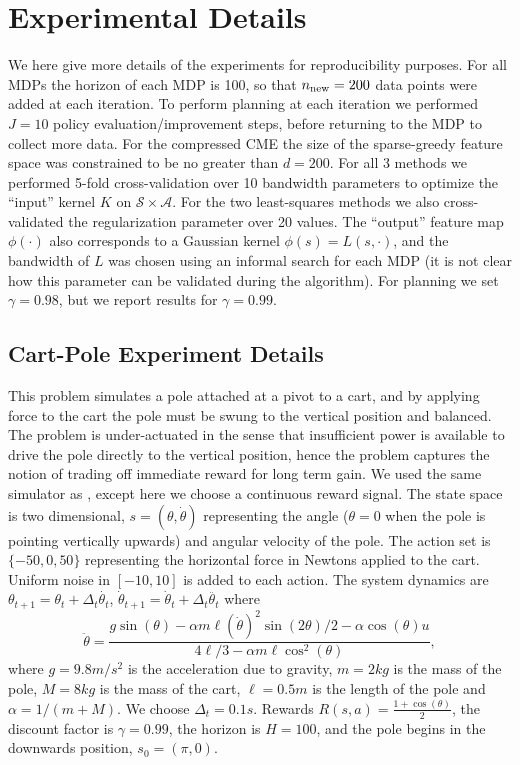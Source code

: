 \documentclass[letterpaper]{article}
\newcommand{\todoc}[2][]{\todo[color=red!20!white,size=\tiny,#1]{#2}}
\newcommand{\cA}{{\mathcal A}}
\newcommand{\cS}{{\mathcal S}}
\begin{document}
\section{Experimental Details} \label{ExperimentDetails}

We here give more details of the experiments for reproducibility purposes. For all MDPs the horizon of each MDP is 100, so that $n_{\rm new} = 200$ data points were added at each iteration. To perform planning at each iteration we performed $J=10$ policy evaluation/improvement steps, before returning to the MDP to collect more data. For the compressed CME the size of the sparse-greedy feature space was constrained to be no greater than $d=200$. For all 3 methods we performed 5-fold cross-validation over 10 bandwidth parameters to optimize the ``input'' kernel $K$ on $\cS\times\cA$. For the two least-squares methods we also cross-validated the regularization parameter over 20 values. The ``output'' feature map $\phi(\cdot)$ also corresponds to a Gaussian kernel $\phi(s) = L(s,\cdot)$, and the bandwidth of $L$ was chosen using an informal search for each MDP (it is not clear how this parameter can be validated during the algorithm). For planning we set $\gamma=0.98$, but we report results for $\gamma=0.99$. \todoc{Why? This is weird and calls for an explanation.}

\subsection{Cart-Pole Experiment Details}

This problem simulates a pole attached at a pivot to a cart, and by applying force to the cart the pole must be swung to the vertical position and balanced. The problem is under-actuated in the sense that insufficient power is available to drive the pole directly to the vertical position, hence the problem captures the notion of trading off immediate reward for long term gain. We used the same simulator as \citet{DBLP:journals/jmlr/LagoudakisP03}, except here we choose a continuous reward signal. The state space is two dimensional, $s = (\theta, \dot{\theta})$ representing the angle ($\theta = 0$ when the pole is pointing vertically upwards) and angular velocity of the pole. The action set is $\{-50,0,50\}$ representing the horizontal force in Newtons applied to the cart. Uniform noise in $[-10,10]$ is added to each action. The system dynamics are $\theta_{t+1} = \theta_t + \Delta_t \dot {\theta_t}$, $\dot\theta_{t+1} = \dot\theta_t + \Delta_t \ddot {\theta_t}$ where
$$ \ddot {\theta} = \frac{g \sin(\theta) - \alpha m \ell (\dot{\theta})^2 \sin(2 \theta)/2 - \alpha \cos(\theta) u}{ 4\ell / 3 - \alpha m \ell \cos^2(\theta)}, $$
where $g=9.8m/s^2$ is the acceleration due to gravity, $m=2kg$ is the mass of the pole, $M = 8kg$ is the mass of the cart, $\ell = 0.5m$ is the length of the pole and $\alpha = 1/(m+M)$. We choose $\Delta_t = 0.1s$. Rewards $R(s,a) = \frac{1+ \cos(\theta)}{2}$, the discount factor is $\gamma = 0.99$, the horizon is $H=100$, and the pole begins in the downwards position, $s_0 = (\pi,0)$.
\end{document}
